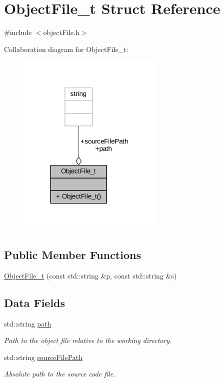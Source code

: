 \hypertarget{struct_object_file__t}{}\section{Object\+File\+\_\+t Struct Reference}
\label{struct_object_file__t}


{\ttfamily \#include $<$object\+File.\+h$>$}



Collaboration diagram for Object\+File\+\_\+t\+:
\nopagebreak
\begin{figure}[H]
\begin{center}
\leavevmode
\includegraphics[width=197pt]{struct_object_file__t__coll__graph}
\end{center}
\end{figure}
\subsection*{Public Member Functions}
\begin{DoxyCompactItemize}
\item 
\hyperlink{struct_object_file__t_a41d511062f71b9f057fb6d7d3b48983a}{Object\+File\+\_\+t} (const std\+::string \&p, const std\+::string \&s)
\end{DoxyCompactItemize}
\subsection*{Data Fields}
\begin{DoxyCompactItemize}
\item 
std\+::string \hyperlink{struct_object_file__t_abde2a292cbc364458fc816641e960f09}{path}
\begin{DoxyCompactList}\small\item\em Path to the object file relative to the working directory. \end{DoxyCompactList}\item 
std\+::string \hyperlink{struct_object_file__t_a2c20caa57255aa59706f7105d08894a8}{source\+File\+Path}
\begin{DoxyCompactList}\small\item\em Absolute path to the source code file. \end{DoxyCompactList}\end{DoxyCompactItemize}



